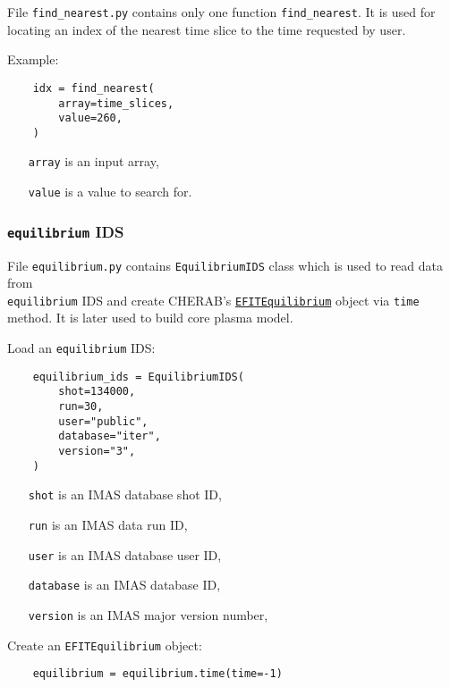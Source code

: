 \documentclass[../main.tex]{subfiles}
\begin{document}
File \texttt{find\_nearest.py} contains only one function \texttt{find\_nearest}. It is used for locating an index of the nearest time slice to the time requested by user.

Example:
\begin{verbatim}
    idx = find_nearest(
        array=time_slices,
        value=260,
    )
\end{verbatim}

\begin{itemize}[align=left]
    \item[\texttt{array}] is an input array,
    \item[\texttt{value}] is a value to search for.
\end{itemize}

\subsubsection{\texttt{equilibrium} IDS}%
\label{sec:equilibrium_ids}

File \texttt{equilibrium.py} contains \texttt{EquilibriumIDS} class which is used to read data from \\ \texttt{equilibrium} IDS and create CHERAB's \href{https://cherab.github.io/documentation/plasmas/equilibrium.html?highlight=efit#cherab.tools.equilibrium.efit.EFITEquilibrium}{\texttt{EFITEquilibrium}} object via \texttt{time} method. It is later used to build core plasma model.

Load an \texttt{equilibrium} IDS:
\begin{verbatim}
    equilibrium_ids = EquilibriumIDS(
        shot=134000,
        run=30,
        user="public",
        database="iter",
        version="3",
    )
\end{verbatim}

\begin{itemize}[align=left]
    \item[\texttt{shot}] is an IMAS database shot ID,
    \item[\texttt{run}] is an IMAS data run ID,
    \item[\texttt{user}] is an IMAS database user ID,
    \item[\texttt{database}] is an IMAS database ID,
    \item[\texttt{version}] is an IMAS major version number,
\end{itemize}

Create an \texttt{EFITEquilibrium} object:
\begin{verbatim}
    equilibrium = equilibrium.time(time=-1)
\end{verbatim}
\end{document}
